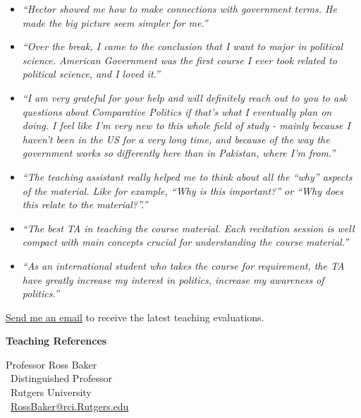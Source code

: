 \documentclass[11pt]{letter} %
\begin{document}
\begin{letter}{}
{\begin{itemize}
\item \emph{``Hector showed me how to make connections with government terms. He made the big picture seem simpler for me.''}

\item \emph{``Over the break, I came to the conclusion that I want to major in political science. American Government was the first course I ever took related to political science, and I loved it.''}

\item \emph{``I am very grateful for your help and will definitely reach out to you to ask questions about Comparative Politics if that's what I eventually plan on doing. I feel like I'm very new to this whole field of study - mainly because I haven't been in the US for a very long time, and because of the way the government works so differently here than in Pakistan, where I'm from.''}

\item \emph{``The teaching assistant really helped me to think about all the ``why'' aspects of the material. Like for example, ``Why is this important?'' or ``Why does this relate to the material?''.''}

\item \emph{``The best TA in teaching the course material. Each recitation session is well compact with main concepts crucial for understanding the course material.''}

\item \emph{``As an international student who takes the course for requirement, the TA have greatly increase my interest in politics, increase my awareness of politics.''}

\end{itemize}

\href{mailto:hector.bahamonde@rutgers.edu}{Send me an email} to receive the latest teaching evaluations.

\vspace{1.5cm}
}{\bf Teaching References}

Professor Ross Baker\\\
Distinguished Professor\\\
Rutgers University\\\
\href{mailto:rosbaker@rci.rutgers.edu}{RossBaker@rci.Rutgers.edu}\vspace{20cm}







\end{letter}
\end{document}
